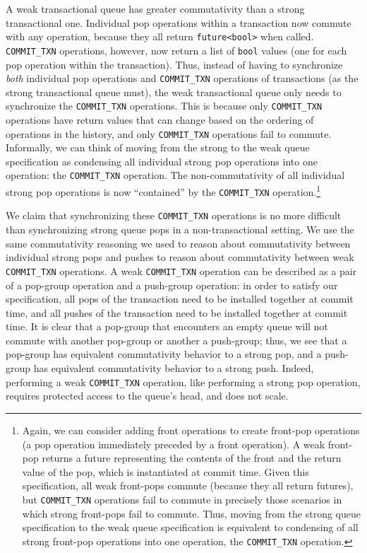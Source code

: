 A weak transactional queue has greater commutativity than a strong transactional one. Individual pop operations within a transaction now commute with any operation, because they all return \texttt{future<bool>} when called. 
\texttt{COMMIT\_TXN} operations, however, now return a list of \texttt{bool} values (one for each pop operation within the transaction). 
Thus, instead of having to synchronize \emph{both} individual pop operations and \texttt{COMMIT\_TXN} operations of transactions (as the strong transactional queue must), the weak transactional queue only needs to synchronize the \texttt{COMMIT\_TXN} operations. This is because only \texttt{COMMIT\_TXN} operations have return values that can change based on the ordering of operations in the history, and only \texttt{COMMIT\_TXN} operations fail to commute. Informally, we can think of moving from the strong to the weak queue specification as condensing all individual strong pop operations into one operation: the \texttt{COMMIT\_TXN} operation. The non-commutativity of all individual strong pop operations is now ``contained'' by the \texttt{COMMIT\_TXN} operation.\footnote{Again, we can consider adding front operations to create front-pop operations (a pop operation immediately preceded by a front operation). A weak front-pop returns a future representing the contents of the front and the return value of the pop, which is instantiated at commit time. Given this specification, all weak front-pops commute (because they all return futures), but \texttt{COMMIT\_TXN} operations fail to commute in precisely those scenarios in which strong front-pops fail to commute. Thus, moving from the strong queue specification to the weak queue specification is equivalent to condensing of all strong front-pop operations into one operation, the \texttt{COMMIT\_TXN} operation.}

We claim that synchronizing these \texttt{COMMIT\_TXN} operations is no more difficult than synchronizing strong queue pops in a non-transactional setting. We use the same commutativity reasoning we used to reason about commutativity between individual strong pops and pushes to reason about commutativity between weak \texttt{COMMIT\_TXN} operations. A weak \texttt{COMMIT\_TXN} operation can be described as a pair of a pop-group operation and a push-group operation: in order to satisfy our specification, all pops of the transaction need to be installed together at commit time, and all pushes of the transaction need to be installed together at commit time. It is clear that a pop-group that encounters an empty queue will not commute with another pop-group or another a push-group; thus, we see that a pop-group has equivalent commutativity behavior to a strong pop, and a push-group has equivalent commutativity behavior to a strong push. Indeed, performing a weak \texttt{COMMIT\_TXN} operation, like performing a strong pop operation, requires protected access to the queue's head, and does not scale.


